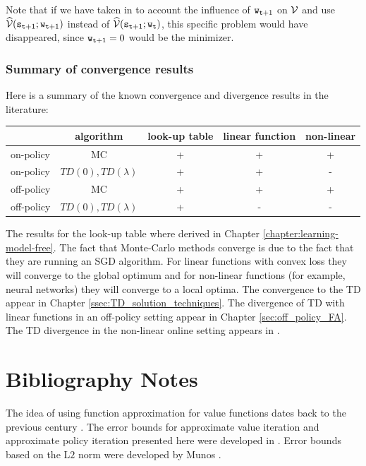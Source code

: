 Note that if we have taken in to account the influence of
${\tt w}_{{\tt t}+1}$ on $\mathcal{V}$ and use
$\widehat{\mathcal{V}}({\tt s}_{{\tt t}+1};{\tt w}_{{\tt t}+1})$ instead of
$\widehat{\mathcal{V}}({\tt s}_{{\tt t}+1};{\tt w}_{\tt t})$, this specific
problem would have disappeared, since ${\tt w}_{{\tt t}+1}=0$ would
be the minimizer.

\subsubsection{Summary of convergence results} 

Here is a summary of the known convergence and divergence results in
the literature:
\begin{center}
  \begin{tabular}{ | l | c | c|c|c| }
    \hline
    & algorithm & look-up table&linear function&non-linear\\ \hline
    on-policy & MC & + & + & + \\ \hline
    on-policy & $TD(0),TD(\lambda)$ & + & + & -\\ \hline
    off-policy & MC & + & + & + \\ \hline
    off-policy & $TD(0),TD(\lambda)$ & + & - & -\\ \hline
  \end{tabular}
\end{center}

The results for the look-up table where derived in Chapter
\ref{chapter:learning-model-free}.
%
The fact that Monte-Carlo methods converge is due to the fact that
they are running an SGD algorithm. For linear functions with convex
loss they will converge to the global optimum and for non-linear
functions (for example, neural networks) they will converge to a
local optima. The convergence to the TD appear in Chapter
\ref{ssec:TD_solution_techniques}. The divergence of TD with linear functions in
an off-policy setting appear in Chapter \ref{sec:off_policy_FA}. The TD
divergence in the non-linear online setting appears in
\cite{TsitsiklisVR97}.


\section{Bibliography Notes}
The idea of using function approximation for value functions dates back to the previous century \cite{bellman1959functional,shannon1950xxii,barto1983neuronlike,Tesauro02}.
The error bounds for approximate value iteration and approximate policy iteration presented here were developed in \cite{BertsekasTsitsiklis96}. Error bounds based on the L$2$ norm were developed by Munos \citep{munos2007performance}.


